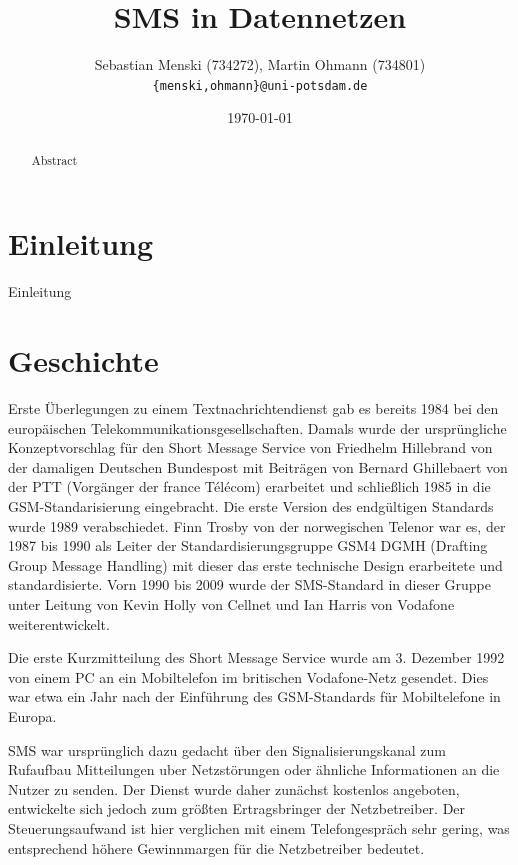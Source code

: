 \documentclass[german,12pt,a4paper]{article}
\begin{document}
\title{\textbf{SMS in Datennetzen}}
\author{Sebastian Menski (734272), Martin Ohmann (734801) \\ \texttt{\{menski,ohmann\}@uni-potsdam.de}}
\date{\today}

\maketitle

\begin{abstract}
Abstract
\end{abstract}

\section{Einleitung}
Einleitung

\section{Geschichte}
Erste Überlegungen zu einem Textnachrichtendienst gab es bereits 1984 bei den 
europäischen Telekommunikationsgesellschaften. Damals wurde der ursprüngliche 
Konzeptvorschlag für den Short Message Service von Friedhelm Hillebrand von der 
damaligen Deutschen Bundespost mit Beiträgen von Bernard Ghillebaert von der PTT 
(Vorgänger der france Télécom) erarbeitet und schließlich 1985 in die 
GSM-Standarisierung eingebracht. Die erste Version des endgültigen Standards 
wurde 1989 verabschiedet. Finn Trosby von der norwegischen Telenor war es, der 
1987 bis 1990 als Leiter der Standardisierungsgruppe GSM4 DGMH (Drafting Group 
Message Handling) mit dieser das erste technische Design erarbeitete und 
standardisierte.
Vorn 1990 bis 2009 wurde der SMS-Standard in dieser Gruppe unter Leitung von 
Kevin Holly von Cellnet und Ian Harris von Vodafone weiterentwickelt.

Die erste Kurzmitteilung des Short Message Service wurde am 3. Dezember 1992 
von einem PC an ein Mobiltelefon im britischen Vodafone-Netz gesendet. Dies 
war etwa ein Jahr nach der Einführung des GSM-Standards für Mobiltelefone in 
Europa.

SMS war ursprünglich dazu gedacht über den Signalisierungskanal zum Rufaufbau
Mitteilungen uber Netzstörungen oder ähnliche Informationen an die Nutzer zu
senden. Der Dienst wurde daher zunächst kostenlos angeboten, entwickelte sich
jedoch zum größten Ertragsbringer der Netzbetreiber. Der Steuerungsaufwand ist
hier verglichen mit einem Telefongespräch sehr gering, was entsprechend höhere
Gewinnmargen für die Netzbetreiber bedeutet.
\end{document}
